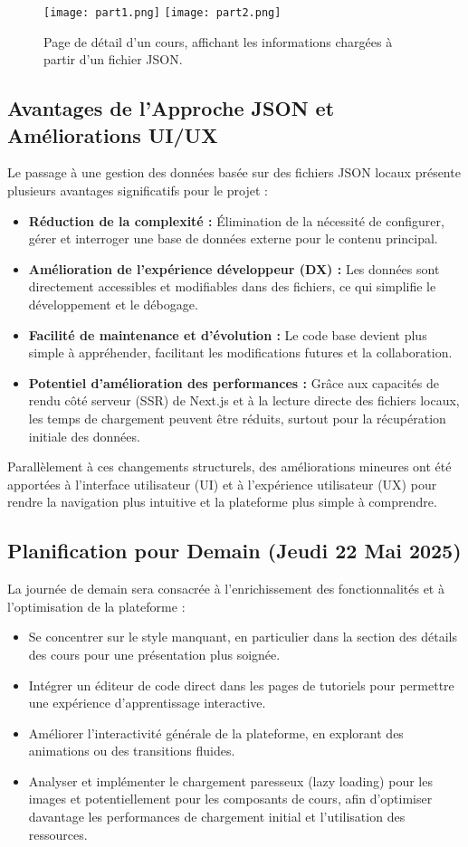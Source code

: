 \documentclass[12pt, a4paper]{article}
\begin{document}
\begin{figure}[htbp]
  \centering
  \texttt{[image: part1.png]} 
   \texttt{[image: part2.png]} %
  \caption{Page de détail d'un cours, affichant les informations chargées à partir d'un fichier JSON.}
  \label{fig:course_details_json}
\end{figure}

\subsection{Avantages de l'Approche JSON et Améliorations UI/UX}
Le passage à une gestion des données basée sur des fichiers JSON locaux présente plusieurs avantages significatifs pour le projet :
\begin{itemize}
  \item \textbf{Réduction de la complexité :} Élimination de la nécessité de configurer, gérer et interroger une base de données externe pour le contenu principal.
  \item \textbf{Amélioration de l'expérience développeur (DX) :} Les données sont directement accessibles et modifiables dans des fichiers, ce qui simplifie le développement et le débogage.
  \item \textbf{Facilité de maintenance et d'évolution :} Le code base devient plus simple à appréhender, facilitant les modifications futures et la collaboration.
  \item \textbf{Potentiel d'amélioration des performances :} Grâce aux capacités de rendu côté serveur (SSR) de Next.js et à la lecture directe des fichiers locaux, les temps de chargement peuvent être réduits, surtout pour la récupération initiale des données.
\end{itemize}
Parallèlement à ces changements structurels, des améliorations mineures ont été apportées à l'interface utilisateur (UI) et à l'expérience utilisateur (UX) pour rendre la navigation plus intuitive et la plateforme plus simple à comprendre.

\subsection{Planification pour Demain (Jeudi 22 Mai 2025)} %
La journée de demain sera consacrée à l'enrichissement des fonctionnalités et à l'optimisation de la plateforme :
\begin{itemize}
  \item Se concentrer sur le style manquant, en particulier dans la section des détails des cours pour une présentation plus soignée.
  \item Intégrer un éditeur de code direct dans les pages de tutoriels pour permettre une expérience d'apprentissage interactive.
  \item Améliorer l'interactivité générale de la plateforme, en explorant des animations ou des transitions fluides.
  \item Analyser et implémenter le chargement paresseux (lazy loading) pour les images et potentiellement pour les composants de cours, afin d'optimiser davantage les performances de chargement initial et l'utilisation des ressources.
\end{itemize}
\end{document}
